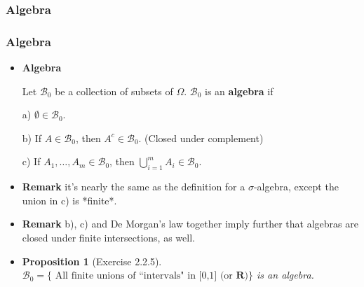 \documentclass[%
]{beamer}
\newtheorem{Proposition}[theorem]{Proposition}%
\begin{document}
\subsubsection{Algebra}
\frame
{
  \frametitle{Algebra}

   \begin{itemize}

      
       \item<1->  \textbf{Algebra} 
       
       Let $\mathcal{B}_0$ be a collection of subsets of $\Omega$.  $\mathcal{B}_0$ is an {\bf algebra} if 
       
       a) $\emptyset \in \mathcal{B}_0$.
    
       b) If $A\in \mathcal{B}_0$, then $A^c \in \mathcal{B}_0$. (Closed under complement) 

       c) If $A_1, \ldots, A_m \in \mathcal{B}_0$, then $\bigcup_{i=1}^m A_i \in \mathcal{B}_0$. 

       \item<2-> \textbf{Remark} it's nearly the same as the definition for a $\sigma$-algebra, except the union in c) is *finite*.         
       
       \item<3-> \textbf{Remark} b), c) and De Morgan's law together imply further that algebras are closed under finite intersections, as well.  
       
       \item<4->   [] \begin{Proposition}[Exercise 2.2.5]
       						$\mathcal{B}_0=\{\text{ All finite unions of ``intervals" in [0,1] (or } \mathbf{R})\}$  is an algebra.   
       					\end{Proposition}    
       
                
                 \end{itemize}
}
\end{document}
